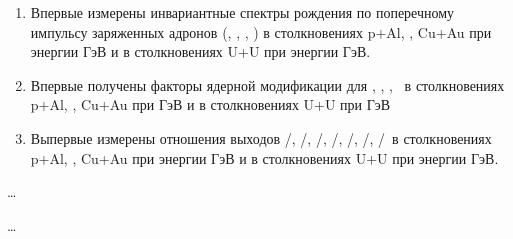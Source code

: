 {\novelty}
\begin{enumerate}[beginpenalty=10000] %
	\item Впервые измерены инвариантные спектры рождения по поперечному импульсу заряженных адронов (\pipm, \Kpm, \prot, \aprot) в столкновениях  p+Al, \heau, Cu+Au при энергии  ГэВ и в столкновениях U+U при энергии  ГэВ.
	\item Впервые получены факторы ядерной модификации для \pipm, \Kpm, \prot, \aprot\, в столкновениях  p+Al, \heau, Cu+Au при  ГэВ и в столкновениях U+U при  ГэВ
	\item 	Выпервые измерены отношения выходов \pim/\pip, \Km/\Kp, \prot/\aprot, \prot/\pip, \aprot/\pim, \Kp/\pip, \Km/\pim\,  в столкновениях  p+Al, \heau, Cu+Au при энергии  ГэВ и в столкновениях U+U при энергии  ГэВ.
\end{enumerate}

{\influence} \ldots

{\methods} \ldots


